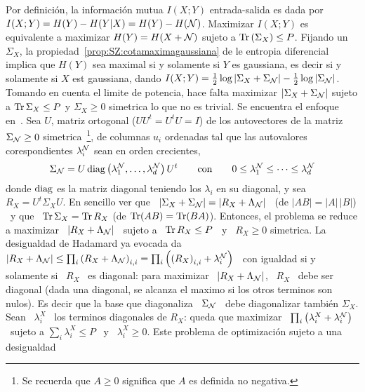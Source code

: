 Por  definici\'on, la informaci\'on  mutua $I(X;Y)$  entrada-salida es  dada por
$I(X;Y) = H(Y) - H(Y|X) = H(Y) - H(\mathcal{N})$. Maximizar $I(X;Y)$ es equivalente a
maximizar  $H(Y) =  H(X  + \mathcal{N})$  sujeto  a $\operatorname{Tr}\left(  \Sigma_X \right)  \le
P$. Fijando un  $\Sigma_X$, la propiedad~\ref{prop:SZ:cotamaximagaussiana} de le
entropia diferencial  implica que $H(Y)$  sea maximal si  y solamente si  $Y$ es
gaussiana, es decir si y solamente si $X$ est gaussiana, dando $I(X;Y) = \frac12
\log \left| \Sigma_X + \Sigma_{\mathcal{N}} \right| - \frac12 \log \left| \Sigma_{\mathcal{N}}
\right|$. Tomando en cuenta el  limite de potencia, hace falta maximizar $\left|
  \Sigma_X +  \Sigma_{\mathcal{N}} \right|$ sujeto a  $\operatorname{Tr} \Sigma_X \le  P$ y $\Sigma_X
\ge   0$  simetrica   lo  que   no  es   trivial.   Se   encuentra   el  enfoque
en~\cite[Sec.~9.4]{CovTho06}.  Sea $U$,  matriz ortogonal ($U U^t =  U^t U = I$)
de los  autovectores de la  matriz $\Sigma_{\mathcal{N}} \ge  0$ simetrica~\footnote{Se
  recuerda que $A \ge 0$ significa que $A$ es definida no negativa.}, de columnas
$u_i$ ordenadas tal que  las autovalores corespondientes $\lambda^{\mathcal{N}}_i$ sean
en orden crecientes,\ie
%
\[
\Sigma_{\mathcal{N}}  =  U \operatorname{diag}\left(  \lambda^{\mathcal{N}}_1  ,  \ldots ,  \lambda^{\mathcal{N}}_d
\right)  U^t \qquad  \mbox{con} \qquad  0  \le \lambda^{\mathcal{N}}_1  \le \cdots  \le
\lambda^{\mathcal{N}}_d
\]
%
donde $\operatorname{diag}$ es  la matriz diagonal teniendo los $\lambda_i$  en su diagonal, y
sea  \ $R_X  =  U^t \Sigma_X  U$.   En sencillo  ver que  \  $\left| \Sigma_X  +
  \Sigma_{\mathcal{N}} \right|  = \left| R_X +  \Lambda_{\mathcal{N}} \right|$ \ (de  $|A B| =
|A| \,  |B|$) \ y  que \ $\operatorname{Tr} \Sigma_X  = \operatorname{Tr} R_X$  (de $\operatorname{Tr}(A B) =  \operatorname{Tr}(B A)$).
Entonces,  el problema  se reduce  a maximizar  \ $\left|  R_X  + \Lambda_{\mathcal{N}}
\right|$  \ sujeto  a  \ $\operatorname{Tr}  R_X \le  P$  \ y  \  $R_X \ge  0$ simetrica.   La
desigualdad de Hadamard ya evocada da \ $\left| R_X + \Lambda_{\mathcal{N}} \right| \le
\prod_i \left(  R_X + \Lambda_{\mathcal{N}}  \right)_{i,i} = \prod_i \left(  \left( R_X
  \right)_{i,i} + \lambda^{\mathcal{N}}_i  \right)$ \ con igualdad si  y solamente si \
$R_X$ \ es  diagonal: para maximizar \ $\left| R_X  + \Lambda_{\mathcal{N}} \right|$, \
$R_X$ \ debe ser diagonal (dada una  diagonal, se alcanza el maximo si los otros
terminos son nulos).   Es decir que la base que  diagonaliza \ $\Sigma_{\mathcal{N}}$ \
debe  diagonalizar tambi\'en $\Sigma_X$.   Sean \  $\lambda^X_i$ \  los terminos
diagonales  de  $R_X$: queda  que  maximizar  \  $\prod_i \left(  \lambda^X_i  +
  \lambda^{\mathcal{N}}_i  \right)$  \  sujeto a  $\sum_i  \lambda^X_i  \le  P$ \  y  \
$\lambda^X_i \ge 0$.   Este problema de optimizaci\'on sujeto  a una desigualdad
